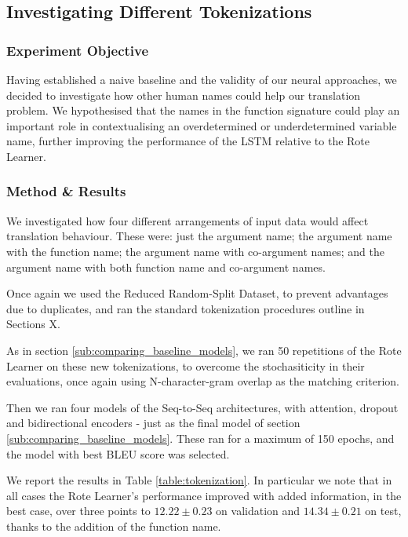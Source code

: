 \subsection{Investigating Different Tokenizations} %
\label{sub:investigating_different_tokenizations}

\subsubsection{Experiment Objective} %

Having established a naive baseline and the validity of our neural approaches, we decided to investigate how other human names could help our translation problem.
We hypothesised that the names in the function signature could play an important role in contextualising an overdetermined or underdetermined variable name, further improving the performance of the LSTM relative to the Rote Learner.

\subsubsection{Method \& Results} %

We investigated how four different arrangements of input data would affect translation behaviour. 
These were:
just the argument name; the argument name with the function name; the argument name with co-argument names; and the argument name with both function name and co-argument names.

Once again we used the Reduced Random-Split Dataset, to prevent advantages due to duplicates, and ran the standard tokenization procedures outline in Sections X. 

As in section \ref{sub:comparing_baseline_models}, we ran 50 repetitions of the Rote Learner on these new tokenizations, to overcome the stochasiticity in their evaluations, once again using N-character-gram overlap as the matching criterion.

Then we ran four models of the Seq-to-Seq architectures, with attention, dropout and bidirectional encoders - just as the final model of section \ref{sub:comparing_baseline_models}. These ran for a maximum of 150 epochs, and the model with best BLEU score was selected. 

We report the results in Table \ref{table:tokenization}. 
In particular we note that in all cases the Rote Learner's performance improved with added information, in the best case, over three points to $12.22 \pm 0.23$ on validation and $14.34 \pm 0.21$ on test, thanks to the addition of the function name. 

